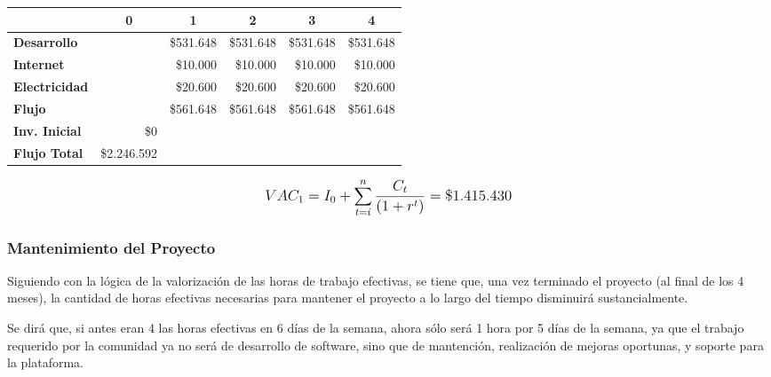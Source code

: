 \begin{center}
	\begin{tabular}{ | l | l | l | l | l | l | }
		\hline
		 & \multicolumn{1}{|c|}{\textbf{0}} & \multicolumn{1}{|c|}{\textbf{1}} & \multicolumn{1}{|c|}{\textbf{2}} & \multicolumn{1}{|c|}{\textbf{3}} & \multicolumn{1}{|c|}{\textbf{4}} \\
		\hline
		{\textbf{Desarrollo}} &  & \multicolumn{1}{|r|}{\$531.648} & \multicolumn{1}{|r|}{\$531.648} & \multicolumn{1}{|r|}{\$531.648} & \multicolumn{1}{|r|}{\$531.648} \\ \hline
		
		{\textbf{Internet}} &  & \multicolumn{1}{|r|}{\$10.000} & \multicolumn{1}{|r|}{\$10.000} & \multicolumn{1}{|r|}{\$10.000} & \multicolumn{1}{|r|}{\$10.000} \\ \hline
		
		{\textbf{Electricidad}} &  & \multicolumn{1}{|r|}{\$20.600} & \multicolumn{1}{|r|}{\$20.600} & \multicolumn{1}{|r|}{\$20.600} & \multicolumn{1}{|r|}{\$20.600} \\ \hline
		
		{\textbf{Flujo}} &  & \multicolumn{1}{|r|}{\$561.648} & \multicolumn{1}{|r|}{\$561.648} & \multicolumn{1}{|r|}{\$561.648} & \multicolumn{1}{|r|}{\$561.648} \\ \hline
		{\textbf{Inv. Inicial}}& \multicolumn{1}{|r|}{\$0} & & & & \\ \hline
		\textbf{Flujo Total} & \multicolumn{1}{|r|}{\$2.246.592} & & & & \\ \hline
	\end{tabular}
\end{center}

\[
\mathlarger{
	{VAC_{1}} = I_0 + \sum\limits_{t=i}^{n}\frac{C_t}{\left(1+r^t\right)} = \$1.415.430
}
\]

\subsubsection{Mantenimiento del Proyecto}
Siguiendo con la lógica de la valorización de las horas de trabajo efectivas, se tiene que, una vez terminado el proyecto (al final de los 4 meses), la cantidad de horas efectivas necesarias para mantener el proyecto a lo largo del tiempo disminuirá sustancialmente.

Se dirá que, si antes eran 4 las horas efectivas en 6 días de la semana, ahora sólo será 1 hora por 5 días de la semana, ya que el trabajo requerido por la comunidad ya no será de desarrollo de software, sino que de mantención, realización de mejoras oportunas, y soporte para la plataforma.

